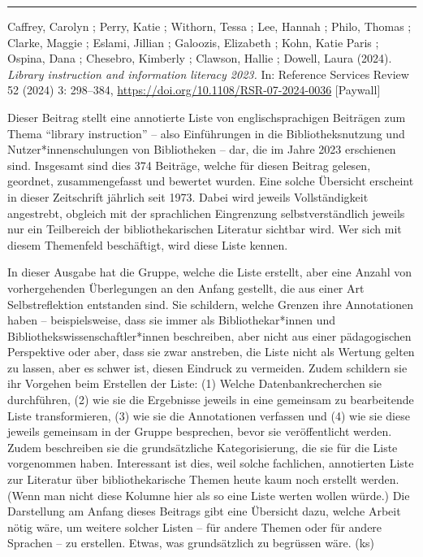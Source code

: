 \documentclass[a4paper,
fontsize=11pt,
oneside,
numbers=noperiodatend,
parskip=half-,
bibliography=totoc,
final
]{scrartcl}
\begin{document}
\begin{center}\rule{0.5\linewidth}{0.5pt}\end{center}

Caffrey, Carolyn ; Perry, Katie ; Withorn, Tessa ; Lee, Hannah ; Philo,
Thomas ; Clarke, Maggie ; Eslami, Jillian ; Galoozis, Elizabeth ; Kohn,
Katie Paris ; Ospina, Dana ; Chesebro, Kimberly ; Clawson, Hallie ;
Dowell, Laura (2024). \emph{Library instruction and information literacy
2023.} In: Reference Services Review 52 (2024) 3: 298--384,
\url{https://doi.org/10.1108/RSR-07-2024-0036} {[}Paywall{]}

Dieser Beitrag stellt eine annotierte Liste von englischsprachigen
Beiträgen zum Thema ``library instruction'' -- also Einführungen in die
Bibliotheksnutzung und Nutzer*innenschulungen von Bibliotheken -- dar,
die im Jahre 2023 erschienen sind. Insgesamt sind dies 374 Beiträge,
welche für diesen Beitrag gelesen, geordnet, zusammengefasst und
bewertet wurden. Eine solche Übersicht erscheint in dieser Zeitschrift
jährlich seit 1973. Dabei wird jeweils Vollständigkeit angestrebt,
obgleich mit der sprachlichen Eingrenzung selbstverständlich jeweils nur
ein Teilbereich der bibliothekarischen Literatur sichtbar wird. Wer sich
mit diesem Themenfeld beschäftigt, wird diese Liste kennen.

In dieser Ausgabe hat die Gruppe, welche die Liste erstellt, aber eine
Anzahl von vorhergehenden Überlegungen an den Anfang gestellt, die aus
einer Art Selbstreflektion entstanden sind. Sie schildern, welche
Grenzen ihre Annotationen haben -- beispielsweise, dass sie immer als
Bibliothekar*innen und Bibliothekswissenschaftler*innen beschreiben,
aber nicht aus einer pädagogischen Perspektive oder aber, dass sie zwar
anstreben, die Liste nicht als Wertung gelten zu lassen, aber es schwer
ist, diesen Eindruck zu vermeiden. Zudem schildern sie ihr Vorgehen beim
Erstellen der Liste: (1) Welche Datenbankrecherchen sie durchführen, (2)
wie sie die Ergebnisse jeweils in eine gemeinsam zu bearbeitende Liste
transformieren, (3) wie sie die Annotationen verfassen und (4) wie sie
diese jeweils gemeinsam in der Gruppe besprechen, bevor sie
veröffentlicht werden. Zudem beschreiben sie die grundsätzliche
Kategorisierung, die sie für die Liste vorgenommen haben. Interessant
ist dies, weil solche fachlichen, annotierten Liste zur Literatur über
bibliothekarische Themen heute kaum noch erstellt werden. (Wenn man
nicht diese Kolumne hier als so eine Liste werten wollen würde.) Die
Darstellung am Anfang dieses Beitrags gibt eine Übersicht dazu, welche
Arbeit nötig wäre, um weitere solcher Listen -- für andere Themen oder
für andere Sprachen -- zu erstellen. Etwas, was grundsätzlich zu
begrüssen wäre. (ks)
\end{document}
